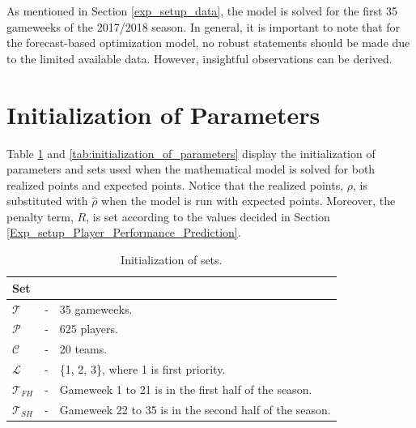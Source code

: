 \newpar

As mentioned in Section \ref{exp_setup_data}, the model is solved for the first 35 gameweeks of the 2017/2018 season. In general, it is important to note that for the forecast-based optimization model, no robust statements should be made due to the limited available data. However, insightful observations can be derived.

\section{Initialization of Parameters}\label{sec:res_init_param}   

Table \ref{tab:initializations_of_sets} and \ref{tab:initialization_of_parameters} display the initialization of parameters and sets used when the mathematical model is solved for both realized points and expected points. Notice that the realized points, $\rho$, is substituted with $\hat{\rho}$ when the model is run with expected points. Moreover, the penalty term, $R$, is set according to the values decided in Section \ref{Exp_setup_Player_Performance_Prediction}.

\begin{table}[H]
\centering
\begin{tabular}{@{}lll@{}}
\toprule
Set           &   &                                                               \\ \midrule
$\mathcal{T}$ & - & 35 gameweeks.                                             \\
$\mathcal{P}$ & - & 625 players.                                              \\
$\mathcal{C}$ & - & 20 teams.                                                 \\
$\mathcal{L}$ & - & \{1, 2, 3\}, where 1 is first priority. \\
$\mathcal{T}_{FH}$ & - & Gameweek 1 to 21 is in the first half of the season. \\
$\mathcal{T}_{SH}$ & - & Gameweek 22 to 35 is in the second half of the season. \\
\bottomrule
\end{tabular}
\caption{Initialization of sets.}
\label{tab:initializations_of_sets}
\end{table}

